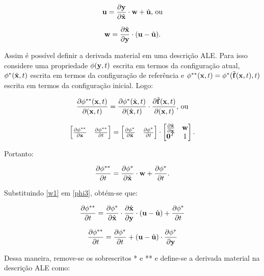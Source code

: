 \documentclass[_ArquivoPrincipal.tex]{subfiles}
\begin{document}
\begin{equation}
    \mathbf{u}=\frac{\partial{\mathbf{y}}}{\partial{\hat{\mathbf{x}}}}\cdot\mathbf{w}+\hat{\mathbf{u}}\text{, ou}
    \label{u1}
\end{equation}

\begin{equation}
    \mathbf{w}=\frac{\partial{\hat{\mathbf{x}}}}{\partial{\mathbf{y}}}\cdot(\mathbf{u}-\hat{\mathbf{u}})\text{.}
    \label{w1}
\end{equation}

Assim é possível definir a derivada material em uma descrição ALE. Para isso considere uma propriedade $\phi(\mathbf{y},t)$ escrita em termos da configuração atual, $\phi^*(\hat{\mathbf{x}},t)$ escrita em termos da configuração de referência e $\phi^{**}(\mathbf{x},t)=\phi^*(\tilde{\mathbf{f}}(\mathbf{x},t),t)$ escrita em termos da configuração inicial. Logo:

\begin{equation}
    \frac{\partial{\phi^{**}(\mathbf{x},t)}}{\partial{(\mathbf{x},t)}}=\frac{\partial{\phi^*(\hat{\mathbf{x}},t)}}{\partial{(\hat{\mathbf{x}},t)}}\cdot\frac{\partial{\tilde{\mathbf{f}}(\mathbf{x},t)}}{\partial{(\mathbf{x},t)}}\text{, ou}
    \label{phi1}
\end{equation}

\begin{equation}
    \begin{bmatrix}\frac{\partial{\phi^{**}}}{\partial{\mathbf{x}}}&\frac{\partial{\phi^{**}}}{\partial{t}}\end{bmatrix}=
    \begin{bmatrix}\frac{\partial{\phi^{*}}}{\partial{\hat{\mathbf{x}}}}&\frac{\partial{\phi^{*}}}{\partial{t}}\end{bmatrix}\cdot
    \begin{bmatrix}\frac{\partial{\hat{\mathbf{x}}}}{\partial{\mathbf{x}}}&\mathbf{w}\\\mathbf{0}^T&1\end{bmatrix}
    \text{.}
    \label{phi2}
\end{equation}

\noindent Portanto:

\begin{equation}
    \frac{\partial{\phi^{**}}}{\partial{t}}=\frac{\partial{\phi^{*}}}{\partial{\hat{\mathbf{x}}}}\cdot\mathbf{w}+\frac{\partial{\phi^{*}}}{\partial{t}}\text{.}
    \label{phi3}
\end{equation}

Substituindo \ref{w1} em \ref{phi3}, obtém-se que:

\[\frac{\partial{\phi^{**}}}{\partial{t}}=\frac{\partial{\phi^{*}}}{\partial{\hat{\mathbf{x}}}}\cdot\frac{\partial{\hat{\mathbf{x}}}}{\partial{\mathbf{y}}}\cdot(\mathbf{u}-\hat{\mathbf{u}})+\frac{\partial{\phi^{*}}}{\partial{t}}\]

\[\frac{\partial{\phi^{**}}}{\partial{t}}=\frac{\partial{\phi^{*}}}{\partial{t}}+(\mathbf{u}-\hat{\mathbf{u}})\cdot\frac{\partial{\phi^{*}}}{\partial{\mathbf{y}}}\]

Dessa maneira, remove-se os sobrescritos * e ** e define-se a derivada material na descrição ALE como:
\end{document}
